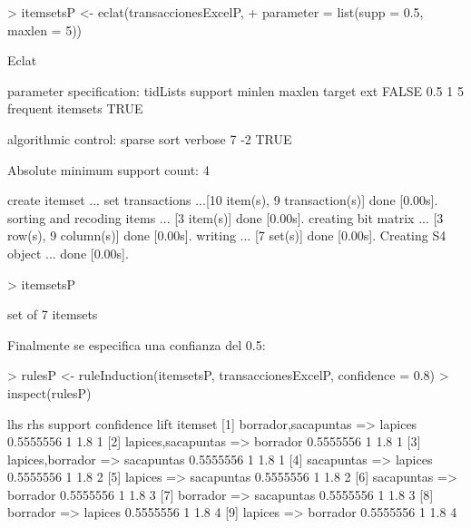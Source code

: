 \documentclass [a4paper] {article}
\begin{document}
\begin{Schunk}
\begin{Sinput}
> itemsetsP <- eclat(transaccionesExcelP,
+ parameter = list(supp = 0.5, maxlen = 5))
\end{Sinput}
\begin{Soutput}
Eclat

parameter specification:
 tidLists support minlen maxlen            target  ext
    FALSE     0.5      1      5 frequent itemsets TRUE

algorithmic control:
 sparse sort verbose
      7   -2    TRUE

Absolute minimum support count: 4 

create itemset ... 
set transactions ...[10 item(s), 9 transaction(s)] done [0.00s].
sorting and recoding items ... [3 item(s)] done [0.00s].
creating bit matrix ... [3 row(s), 9 column(s)] done [0.00s].
writing  ... [7 set(s)] done [0.00s].
Creating S4 object  ... done [0.00s].
\end{Soutput}
\begin{Sinput}
> itemsetsP
\end{Sinput}
\begin{Soutput}
set of 7 itemsets 
\end{Soutput}
\end{Schunk}

Finalmente se especifica una confianza del 0.5:
\begin{Schunk}
\begin{Sinput}
> rulesP <- ruleInduction(itemsetsP, transaccionesExcelP, confidence = 0.8)
> inspect(rulesP)
\end{Sinput}
\begin{Soutput}
    lhs                      rhs          support   confidence lift itemset
[1] {borrador,sacapuntas} => {lapices}    0.5555556 1          1.8  1      
[2] {lapices,sacapuntas}  => {borrador}   0.5555556 1          1.8  1      
[3] {lapices,borrador}    => {sacapuntas} 0.5555556 1          1.8  1      
[4] {sacapuntas}          => {lapices}    0.5555556 1          1.8  2      
[5] {lapices}             => {sacapuntas} 0.5555556 1          1.8  2      
[6] {sacapuntas}          => {borrador}   0.5555556 1          1.8  3      
[7] {borrador}            => {sacapuntas} 0.5555556 1          1.8  3      
[8] {borrador}            => {lapices}    0.5555556 1          1.8  4      
[9] {lapices}             => {borrador}   0.5555556 1          1.8  4      
\end{Soutput}
\end{Schunk}
\end{document}
